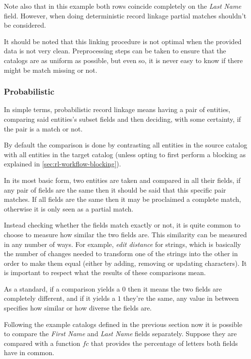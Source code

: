 \documentclass[epsfig,a4paper,11pt,titlepage,twoside,openany]{book}
\begin{document}
Note also that in this example both rows coincide completely on the \textit{Last Name} field. However, when doing deterministic record linkage partial matches shouldn't be considered.

It should be noted that this linking procedure is not optimal when the provided data is not very
clean. Preprocessing steps can be taken to ensure that the catalogs are as
uniform as possible, but even so, it is never easy to know if there might be match missing or not.


\subsubsection{Probabilistic}
\label{sec:rl-approach-probabilistic}

In simple terms, probabilistic record linkage \cite{Sayers2015} means having a pair of entities, comparing said entities’s subset fields and
then deciding, with some certainty, if the pair is a match or not.

By default the comparison is done by contrasting all entities in the source
catalog with all entities in the target catalog (unless  opting to first
perform a blocking as explained in \autoref{sec:rl-workflow-blocking}).

In its most basic form, two entities are taken and compared in all their fields, if any pair of fields are the same then it should be said that this specific pair matches. If all
fields are the same then it may be proclaimed a complete match, otherwise it is only seen as a partial match.

Instead checking whether the fields match exactly or not, it is quite common to choose to measure how similar the two fields are. This similarity can be measured
in any number of ways. For example, \textit{edit distance} for strings, which is basically the number of changes needed to transform one of the strings into the other in order to make them equal (either by adding, removing or updating characters). It is
important to respect what the results of these comparisons mean. 

As a standard, if a comparison yields a $0$ then it means the two fields are completely
different, and if it yields a $1$ they're the same, any value in between
specifies how similar or how diverse the fields are.

Following the example catalogs defined in the previous section now it is possible to compare the \textit{First Name} and \textit{Last Name} fields separately.
Suppose they are compared with a function $fc$ that provides the percentage of
letters both fields have in common.
\end{document}
